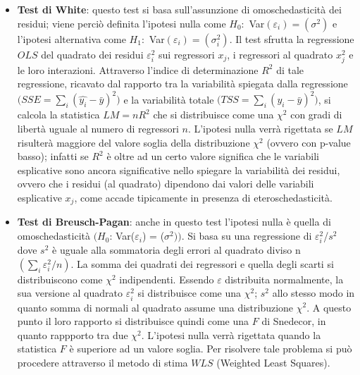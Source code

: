 \documentclass[a4page, 11pt]{article} %
\begin{document}
\begin{itemize}
\item \textbf{Test di White}: questo test si basa sull’assunzione di omoschedasticità dei residui; viene perciò definita l’ipotesi nulla come $H_0:$ Var$(\varepsilon_i) = (\sigma^2)$ e l’ipotesi alternativa come $H_1:$ Var$(\varepsilon_i ) = ( \sigma^2_i )$.
Il test sfrutta la regressione $OLS$ del quadrato dei residui $\varepsilon_i^2$ sui regressori $x_j$, i regressori al quadrato $x_j^2$ e le loro interazioni.
Attraverso l'indice di determinazione $R^{2}$ di tale regressione, ricavato dal rapporto tra la variabilità spiegata dalla regressione $\bigl(SSE = \sum_{i}(\hat{y_i} - \bar{y})^2\bigr)$ e la variabilità totale $\bigl(TSS = \sum_{i} (y_i - \bar{y})^2\bigr)$, si calcola la statistica $LM=n R^{2}$ che si distribuisce come una $\chi^{2}$ con gradi di libertà uguale al numero di regressori $n$. L’ipotesi nulla verrà rigettata se $LM$ risulterà maggiore del valore soglia della distribuzione $\chi^{2}$ (ovvero con p-value basso); %
infatti se $R^{2}$ è oltre ad un certo valore significa che le variabili esplicative sono ancora significative nello spiegare la variabilità dei residui, ovvero che i residui (al quadrato) dipendono dai valori delle variabili esplicative $x_j$, come accade tipicamente in presenza di eteroschedasticità.

\item \textbf{Test di Breusch-Pagan}: anche in questo test l’ipotesi nulla è quella di omoschedasticità $\bigl(H_0$: Var($\varepsilon_i$) = ($\sigma^2)\bigr)$.
Si basa su una regressione di $\varepsilon^{2}_i$/$s^{2}$ dove $s^{2}$ è uguale alla sommatoria degli errori al quadrato diviso n $(\sum_{i}\varepsilon_i^2 / n)$. La somma dei quadrati dei regressori e quella degli scarti si distribuiscono come $\chi^{2}$ indipendenti. Essendo $\varepsilon$ distribuita normalmente, la sua versione al quadrato $\varepsilon_i^2$ si distribuisce come una $\chi^2$; $s^2$ allo stesso modo in quanto somma di normali al quadrato assume una distribuzione $\chi^2$. A questo punto il loro rapporto si distribuisce quindi come una $F$ di Snedecor, in quanto rappporto tra due $\chi^2$. L’ipotesi nulla verrà rigettata quando la statistica $F$ è superiore ad un valore soglia.
Per risolvere tale problema si può procedere attraverso il metodo di stima $WLS$ (Weighted Least Squares).
\end{itemize}
\end{document}
